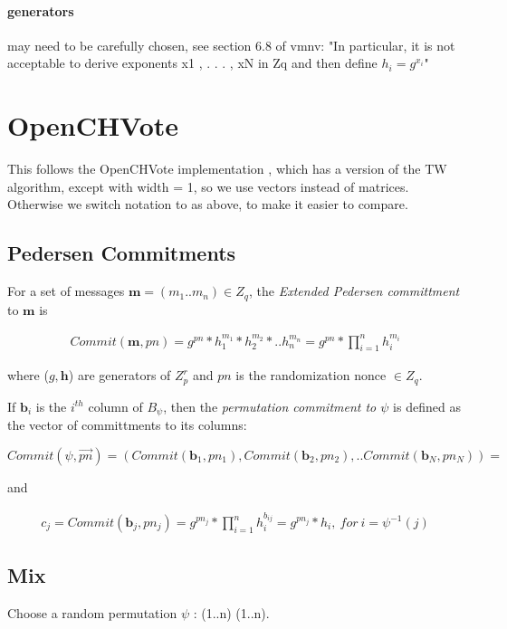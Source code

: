 \documentclass{article}
\begin{document}
\paragraph{generators} may need to be carefully chosen, see section 6.8
of vmnv: "In particular, it is not acceptable to derive exponents
x1 , . . . , xN in Zq and then define $h_i = g^{x_i}$"

\section{OpenCHVote}

This follows the OpenCHVote implementation \cite{OpenCHVote}, which has a version
of the TW algorithm, except with width = 1, so we use vectors instead of matrices.
Otherwise we switch notation to as above, to make it easier to compare.

\subsection*{Pedersen Commitments}

For a set of messages $\textbf{m}=(m_{1}..m_{n})\in Z_{q}$, the \emph{Extended
Pedersen committment} to $\textbf{m}$ is

\begin{align*}
Commit(\textbf{m},pn)=g^{pn}*h_{1}^{m_{1}}*h_{2}^{m_{2}}*..h_{n}^{m_{n}}=g^{pn}*\prod_{i=1}^{n}h_{i}^{m_{i}}
\end{align*}

where ($g,\textbf{h}$) are generators of $Z_{p}^{r}$ and $pn$ is
the randomization nonce $\in Z_{q}$.

If $\textbf{b}_{i}$ is the $i^{th}$ column of $B_{\psi}$, then
the \emph{permutation commitment to $\psi$} is defined as the vector
of committments to its columns:

\[
Commit(\psi,\vec{pn})=(Commit(\textbf{b}_{1},pn_{1}),Commit(\textbf{b}_{2},pn_{2}),..Commit(\textbf{b}_{N},pn_{N}))=
\]

and

\begin{align*}
c_{j}=Commit(\textbf{b}_{j},pn_{j})=g^{pn_{j}}*\prod_{i=1}^{n}h_{i}^{b_{ij}}=g^{pn_{j}}*h_{i},\ for\ i=\psi^{-1}(j)
\end{align*}


\subsection*{Mix}

Choose a random permutation $\psi$ : (1..n) (1..n).
\end{document}
